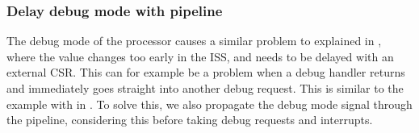 \subsubsection{Delay debug mode with pipeline}

The debug mode of the processor causes a similar problem to  explained in , where the value changes too early in the ISS, and needs to be delayed with an external CSR. This can for example be a problem when a debug handler returns and immediately goes straight into another debug request. This is similar to the example with  in . To solve this, we also propagate the debug mode signal through the pipeline, considering this before taking debug requests and interrupts.


%
%
%
%
%
%
%



